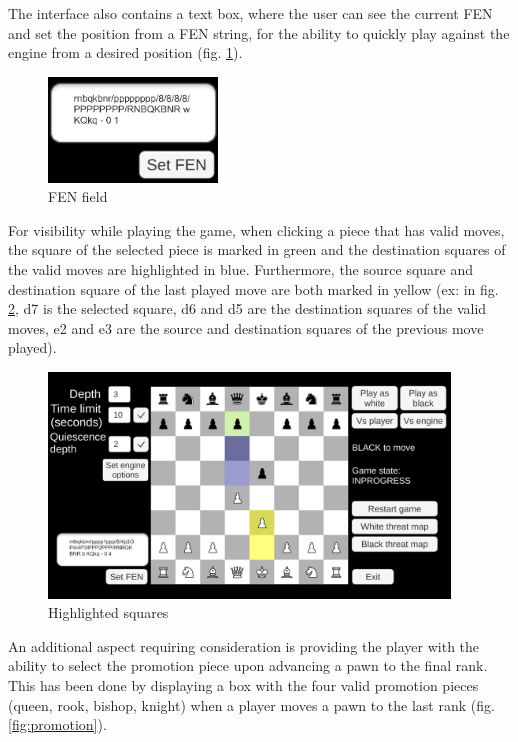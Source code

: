The interface also contains a text box, where the user can see the current FEN and set the position from a FEN string, for the ability to quickly play against the engine from a desired position (fig. \ref{fig:fenField}).

\begin{figure}[h]
    \centering
    \includegraphics[width=0.4\textwidth]{figures/chess-game-fen-field.png}
    \caption{FEN field}
    \label{fig:fenField}
\end{figure}

For visibility while playing the game, when clicking a piece that has valid moves, the square of the selected piece is marked in green and the destination squares of the valid moves are highlighted in blue. Furthermore, the source square and destination square of the last played move are both marked in yellow (ex: in fig. \ref{fig:highlightedSquares}, d7 is the selected square, d6 and d5 are the destination squares of the valid moves, e2 and e3 are the source and destination squares of the previous move played).

\begin{figure}[h]
    \centering
    \includegraphics[width=0.95\textwidth]{figures/chess-game-squares.png}
    \caption{Highlighted squares}
    \label{fig:highlightedSquares}
\end{figure}

An additional aspect requiring consideration is providing the player with the ability to select the promotion piece upon advancing a pawn to the final rank. This has been done by displaying a box with the four valid promotion pieces (queen, rook, bishop, knight) when a player moves a pawn to the last rank (fig. \ref{fig:promotion}).

